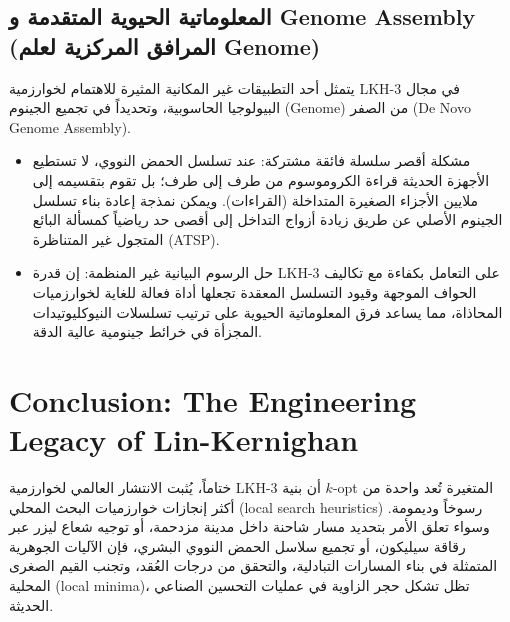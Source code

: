 \documentclass{article}
\newcommand{\en}[1]{\textenglish{#1}}
\begin{document}
\subsection{المعلوماتية الحيوية المتقدمة و \en{Genome Assembly} (المرافق المركزية لعلم \en{Genome})}
يتمثل أحد التطبيقات غير المكانية المثيرة للاهتمام لخوارزمية \en{LKH-3} في مجال البيولوجيا الحاسوبية، وتحديداً في تجميع الجينوم (\en{Genome}) من الصفر (\en{De Novo Genome Assembly}).

\begin{itemize}
	\item
	مشكلة أقصر سلسلة فائقة مشتركة: عند تسلسل الحمض النووي، لا تستطيع الأجهزة الحديثة قراءة الكروموسوم من طرف إلى طرف؛ بل تقوم بتقسيمه إلى ملايين الأجزاء الصغيرة المتداخلة (القراءات). ويمكن نمذجة إعادة بناء تسلسل الجينوم الأصلي عن طريق زيادة أزواج التداخل إلى أقصى حد رياضياً كمسألة البائع المتجول غير المتناظرة (\en{ATSP}).

	\item
	حل الرسوم البيانية غير المنظمة: إن قدرة \en{LKH-3} على التعامل بكفاءة مع تكاليف الحواف الموجهة وقيود التسلسل المعقدة تجعلها أداة فعالة للغاية لخوارزميات المحاذاة، مما يساعد فرق المعلوماتية الحيوية على ترتيب تسلسلات النيوكليوتيدات المجزأة في خرائط جينومية عالية الدقة.
\end{itemize}

\section{\en{Conclusion: The Engineering Legacy of Lin-Kernighan}}
ختاماً، يُثبت الانتشار العالمي لخوارزمية \en{LKH-3} أن بنية $k$-opt المتغيرة تُعد واحدة من أكثر إنجازات خوارزميات البحث المحلي (\en{local search heuristics}) رسوخاً وديمومة. وسواء تعلق الأمر بتحديد مسار شاحنة داخل مدينة مزدحمة، أو توجيه شعاع ليزر عبر رقاقة سيليكون، أو تجميع سلاسل الحمض النووي البشري، فإن الآليات الجوهرية المتمثلة في بناء المسارات التبادلية، والتحقق من درجات العُقد، وتجنب القيم الصغرى المحلية (\en{local minima})، تظل تشكل حجر الزاوية في عمليات التحسين الصناعي الحديثة.
\end{document}

